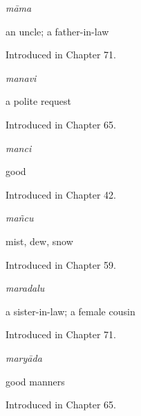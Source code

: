 \noindent\begin{minipage}[t]{\linewidth}
\raggedright
\textbf{}\enspace\emph{māma}\par
\small an uncle; a father-in-law\par
\footnotesize Introduced in Chapter 71.
\end{minipage}\par\medskip

\noindent\begin{minipage}[t]{\linewidth}
\raggedright
\textbf{}\enspace\emph{manavi}\par
\small a polite request\par
\footnotesize Introduced in Chapter 65.
\end{minipage}\par\medskip

\noindent\begin{minipage}[t]{\linewidth}
\raggedright
\textbf{}\enspace\emph{manci}\par
\small good\par
\footnotesize Introduced in Chapter 42.
\end{minipage}\par\medskip

\noindent\begin{minipage}[t]{\linewidth}
\raggedright
\textbf{}\enspace\emph{mañcu}\par
\small mist, dew, snow\par
\footnotesize Introduced in Chapter 59.
\end{minipage}\par\medskip

\noindent\begin{minipage}[t]{\linewidth}
\raggedright
\textbf{}\enspace\emph{maradalu}\par
\small a sister-in-law; a female cousin\par
\footnotesize Introduced in Chapter 71.
\end{minipage}\par\medskip

\noindent\begin{minipage}[t]{\linewidth}
\raggedright
\textbf{}\enspace\emph{maryāda}\par
\small good manners\par
\footnotesize Introduced in Chapter 65.
\end{minipage}\par\medskip

